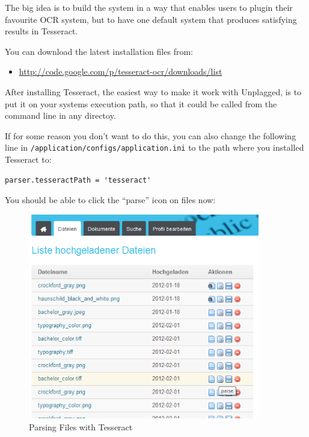 The big idea is to build the system in a way that enables users to
plugin their favourite OCR system, but to have one default system that produces satisfying results in Tesseract.

You can download the latest installation files from:

\begin{itemize}
\item \url{http://code.google.com/p/tesseract-ocr/downloads/list}
\end{itemize}

After installing Tesseract, the easiest way to make it work with Unplagged, is to put it on your systems execution path,
so that it could be called from the command line in any directoy.

If for some reason you don't want to do this, you can also change the following line in 
\texttt{/application/configs/application.ini} to the path where you installed Tesseract to:

\begin{lstlisting}[caption=Tesseract executable path]
parser.tesseractPath = 'tesseract'
\end{lstlisting}

You should be able to click the \enquote{parse} icon on files now:

\begin{figure}[htbp]
  \centering
    \includegraphics[width=0.9\textwidth]{images/parse-button.png}
  \caption{Parsing Files with Tesseract}
  \label{fig:parseButton}
\end{figure}

